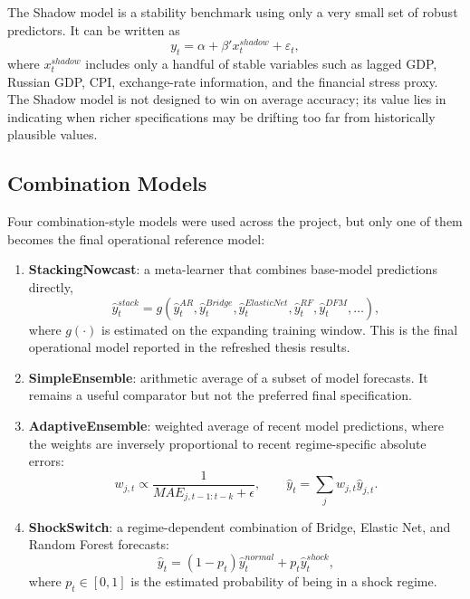 \documentclass[12pt,a4paper]{report}
\begin{document}
The Shadow model is a stability benchmark using only a very small set of robust predictors. It can be written as
\begin{equation}
    y_t = \alpha + \beta' x_t^{shadow} + \varepsilon_t,
\end{equation}
where $x_t^{shadow}$ includes only a handful of stable variables such as lagged GDP, Russian GDP, CPI, exchange-rate information, and the financial stress proxy. The Shadow model is not designed to win on average accuracy; its value lies in indicating when richer specifications may be drifting too far from historically plausible values.

\subsection{Combination Models}

Four combination-style models were used across the project, but only one of them becomes the final operational reference model:
\begin{enumerate}
    \item \textbf{StackingNowcast}: a meta-learner that combines base-model predictions directly,
    \begin{equation}
        \hat{y}_t^{stack} = g\!\left(\hat{y}_t^{AR}, \hat{y}_t^{Bridge}, \hat{y}_t^{ElasticNet}, \hat{y}_t^{RF}, \hat{y}_t^{DFM}, \ldots \right),
    \end{equation}
    where $g(\cdot)$ is estimated on the expanding training window. This is the final operational model reported in the refreshed thesis results.
    \item \textbf{SimpleEnsemble}: arithmetic average of a subset of model forecasts. It remains a useful comparator but not the preferred final specification.
    \item \textbf{AdaptiveEnsemble}: weighted average of recent model predictions, where the weights are inversely proportional to recent regime-specific absolute errors:
    \begin{equation}
        w_{j,t} \propto \frac{1}{MAE_{j,t-1:t-k} + \epsilon}, \qquad
        \hat{y}_t = \sum_j w_{j,t}\hat{y}_{j,t}.
    \end{equation}
    \item \textbf{ShockSwitch}: a regime-dependent combination of Bridge, Elastic Net, and Random Forest forecasts:
    \begin{equation}
        \hat{y}_t = (1-p_t)\hat{y}^{normal}_t + p_t \hat{y}^{shock}_t,
    \end{equation}
    where $p_t \in [0,1]$ is the estimated probability of being in a shock regime.
\end{enumerate}
\end{document}
